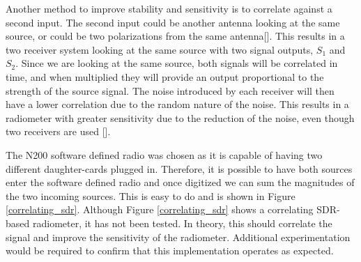  
Another method to improve stability and sensitivity is to correlate against a second input.  The second input could be another antenna looking at the same source, or could be two polarizations from the same antenna[\cite{Clapp}].  This results in a two receiver system looking at the same source with two signal outputs, $S_1$ and $S_2$.  Since we are looking at the same source, both signals will be correlated in time, and when multiplied they will provide an output proportional to the strength of the source signal.  The noise introduced by each receiver will then have a lower correlation due to the random nature of the noise.  This results in a radiometer with greater sensitivity due to the reduction of the noise, even though two receivers are used [\cite{Fujimoto}].

The N200 software defined radio was chosen as it is capable of having two different daughter-cards plugged in.  Therefore, it is possible to have both sources enter the software defined radio and once digitized we can sum the magnitudes of the two incoming sources.  This is easy to do and is shown in Figure \ref{correlating_sdr}.  Although Figure \ref{correlating_sdr} shows a correlating SDR-based radiometer, it has not been tested.  In theory, this should correlate the signal and improve the sensitivity of the radiometer.  Additional experimentation would be required to confirm that this implementation operates as expected.



